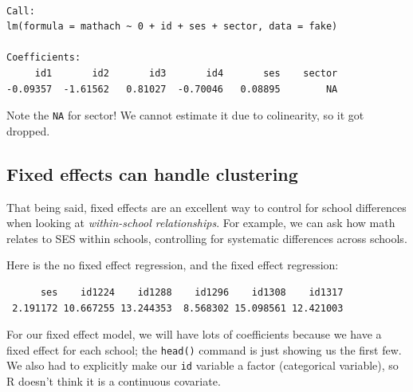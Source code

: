 \documentclass[
  letterpaper,
  DIV=11,
  numbers=noendperiod]{scrreprt}
\newenvironment{Shaded}{}{}
\newcommand{\AttributeTok}[1]{\textcolor[rgb]{0.49,0.56,0.16}{#1}}
\newcommand{\DecValTok}[1]{\textcolor[rgb]{0.25,0.63,0.44}{#1}}
\newcommand{\FunctionTok}[1]{\textcolor[rgb]{0.02,0.16,0.49}{#1}}
\newcommand{\NormalTok}[1]{#1}
\newcommand{\OtherTok}[1]{\textcolor[rgb]{0.00,0.44,0.13}{#1}}
\newcommand{\SpecialCharTok}[1]{\textcolor[rgb]{0.25,0.44,0.63}{#1}}
\begin{document}
\begin{verbatim}

Call:
lm(formula = mathach ~ 0 + id + ses + sector, data = fake)

Coefficients:
     id1       id2       id3       id4       ses    sector  
-0.09357  -1.61562   0.81027  -0.70046   0.08895        NA  
\end{verbatim}

Note the \texttt{NA} for sector! We cannot estimate it due to
colinearity, so it got dropped.

\subsection{Fixed effects can handle
clustering}\label{fixed-effects-can-handle-clustering}

That being said, fixed effects are an excellent way to control for
school differences when looking at \emph{within-school relationships}.
For example, we can ask how math relates to SES within schools,
controlling for systematic differences across schools.

Here is the no fixed effect regression, and the fixed effect regression:

\begin{Shaded}
\end{Shaded}

\begin{verbatim}
      ses    id1224    id1288    id1296    id1308    id1317 
 2.191172 10.667255 13.244353  8.568302 15.098561 12.421003 
\end{verbatim}

For our fixed effect model, we will have lots of coefficients because we
have a fixed effect for each school; the \texttt{head()} command is just
showing us the first few. We also had to explicitly make our \texttt{id}
variable a factor (categorical variable), so R doesn't think it is a
continuous covariate.
\end{document}
